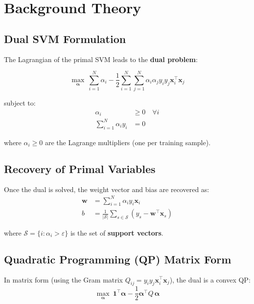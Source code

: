 \documentclass[12pt,a4paper]{article}
\begin{document}
\section{Background Theory}

\subsection{Dual SVM Formulation}

The Lagrangian of the primal SVM leads to the \textbf{dual problem}:

\begin{equation}
  \max_{\boldsymbol{\alpha}}\ \sum_{i=1}^{N} \alpha_i
  - \frac{1}{2}\sum_{i=1}^{N}\sum_{j=1}^{N} \alpha_i\alpha_j y_i y_j \mathbf{x}_i^\top\mathbf{x}_j
  \label{eq:dual}
\end{equation}

subject to:
\begin{align}
  \alpha_i &\geq 0 \quad \forall i \\
  \sum_{i=1}^{N} \alpha_i y_i &= 0
\end{align}

where $\alpha_i \geq 0$ are the Lagrange multipliers (one per training sample).

\subsection{Recovery of Primal Variables}

Once the dual is solved, the weight vector and bias are recovered as:
\begin{align}
  \mathbf{w} &= \sum_{i=1}^{N} \alpha_i y_i \mathbf{x}_i \\
  b &= \frac{1}{|\mathcal{S}|} \sum_{s \in \mathcal{S}} \!\left(y_s - \mathbf{w}^\top \mathbf{x}_s\right)
\end{align}

where $\mathcal{S} = \{i : \alpha_i > \varepsilon\}$ is the set of \textbf{support vectors}.

\subsection{Quadratic Programming (QP) Matrix Form}

In matrix form (using the Gram matrix $Q_{ij} = y_i y_j \mathbf{x}_i^\top\mathbf{x}_j$), the dual is a convex QP:
\begin{equation}
  \max_{\boldsymbol{\alpha}}\ \mathbf{1}^\top\boldsymbol{\alpha} - \frac{1}{2}\boldsymbol{\alpha}^\top Q\,\boldsymbol{\alpha}
  \label{eq:qp}
\end{equation}
\end{document}
